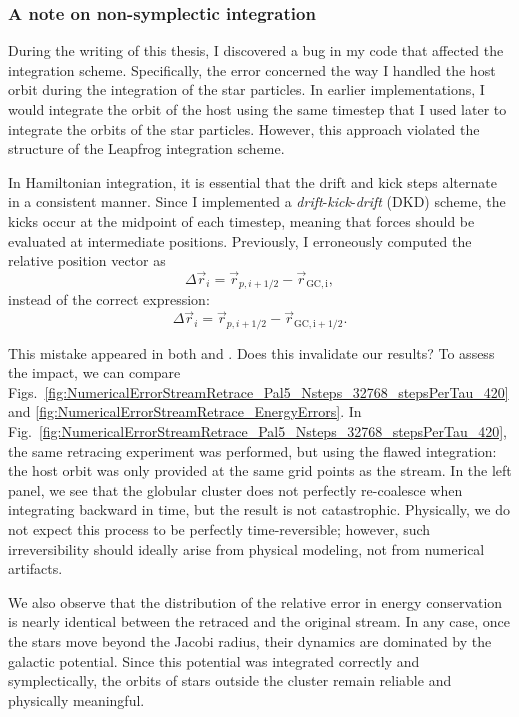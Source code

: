         \subsubsection{A note on non-symplectic integration}

        During the writing of this thesis, I discovered a bug in my code that affected the integration scheme. Specifically, the error concerned the way I handled the host orbit during the integration of the star particles. In earlier implementations, I would integrate the orbit of the host using the same timestep that I used later to integrate the orbits of the star particles. However, this approach violated the structure of the Leapfrog integration scheme.

        In Hamiltonian integration, it is essential that the drift and kick steps alternate in a consistent manner. Since I implemented a \textit{drift}-\textit{kick}-\textit{drift} (DKD) scheme, the kicks occur at the midpoint of each timestep, meaning that forces should be evaluated at intermediate positions. Previously, I erroneously computed the relative position vector as
        \[
        \Delta \vec{r}_i = \vec{r}_{p,i+1/2} - \vec{r}_\mathrm{GC,i},
        \]
        instead of the correct expression:
        \[
        \Delta \vec{r}_i = \vec{r}_{p,i+1/2} - \vec{r}_\mathrm{GC,i+1/2}.
        \]

        This mistake appeared in both \citet{2023A&A...673A..44F} and \citet{2025A&A...699A.289F}. Does this invalidate our results? To assess the impact, we can compare Figs.~\ref{fig:NumericalErrorStreamRetrace_Pal5_Nsteps_32768_stepsPerTau_420} and \ref{fig:NumericalErrorStreamRetrace_EnergyErrors}. In Fig.~\ref{fig:NumericalErrorStreamRetrace_Pal5_Nsteps_32768_stepsPerTau_420}, the same retracing experiment was performed, but using the flawed integration: the host orbit was only provided at the same grid points as the stream. In the left panel, we see that the globular cluster does not perfectly re-coalesce when integrating backward in time, but the result is not catastrophic. Physically, we do not expect this process to be perfectly time-reversible; however, such irreversibility should ideally arise from physical modeling, not from numerical artifacts.

        We also observe that the distribution of the relative error in energy conservation is nearly identical between the retraced and the original stream. In any case, once the stars move beyond the Jacobi radius, their dynamics are dominated by the galactic potential. Since this potential was integrated correctly and symplectically, the orbits of stars outside the cluster remain reliable and physically meaningful.

